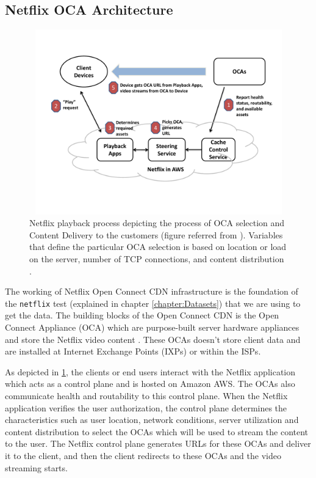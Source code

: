 \subsection*{Netflix OCA Architecture}

\begin{figure}[!ht]
	\centering
	\includegraphics[keepaspectratio, height=8cm, width=15cm]{figures/netflix-oca-architecture.pdf}
	\caption[Netflix OCA Architecture]{Netflix playback process depicting the process of OCA selection and Content Delivery to the customers (figure referred from \cite{ocaoverview}). Variables that define the particular OCA selection is based on location or 
	load on the server, number of TCP connections, and content distribution \cite{netflixfast}.}
	\label{fig:Netflix OCA Architecture}
\end{figure}

The working of Netflix Open Connect CDN infrastructure \cite{ocaoverview} is the foundation of the \texttt{netflix} test (explained in chapter \ref{chapter:Datasets}) that we are using to get the data. 
The building blocks of the Open Connect CDN is the Open Connect Appliance (OCA) which are purpose-built server hardware appliances and store the Netflix video content \cite{ocaoverview}. These OCAs doesn't store client data and are installed at Internet Exchange Points (IXPs) or within the ISPs. 

As depicted in \cref{fig:Netflix OCA Architecture}, the clients or end users interact with the Netflix application which acts as a control plane and is hosted on Amazon AWS.
The OCAs also communicate health and routability to this control plane. When the Netflix application verifies the user authorization, the control plane determines the characteristics such as user location, network conditions, server utilization and content distribution to select the OCAs which will be used to stream the content to the user. The Netflix control plane generates URLs for these OCAs and 
deliver it to the client, and then the client redirects to these OCAs and the video streaming starts.